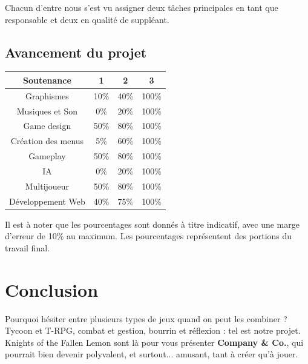 \documentclass{article}
\begin{document}
Chacun d'entre nous s'est vu assigner deux tâches principales en tant que responsable et deux en qualité de suppléant. 

\subsection{Avancement du projet}
\begin{center}
   \begin{tabular}{ | c || c | c | c | }
     \hline
 	 \textbf{Soutenance} & \textbf{1} & \textbf{2} & \textbf{3}    \\ \hline
     Graphismes & 10\% & 40\% & 100\% \\ \hline
     Musiques et Son & 0\% & 20\% & 100\% \\ \hline
     Game design & 50\% & 80\% & 100\% \\ \hline
     Création des menus & 5\% & 60\%  & 100\% \\ \hline
     Gameplay & 50\% & 80\%  & 100\% \\ \hline
     IA & 0\% & 20\%  & 100\% \\ \hline
     Multijoueur & 50\% & 80\% & 100\% \\ \hline
     Développement Web & 40\% & 75\% & 100\% \\ \hline
   \end{tabular}
 \end{center}

Il est à noter que les pourcentages sont donnés à titre indicatif, avec une marge d'erreur de 10\% au maximum. Les pourcentages représentent des portions du travail final.

\section*{Conclusion}
Pourquoi hésiter entre plusieurs types de jeux quand on peut les combiner ? Tycoon et T-RPG, combat et gestion, bourrin et réflexion : tel est notre projet. Knights of the Fallen Lemon sont là pour vous présenter \textbf{Company \& Co.}, qui pourrait bien devenir polyvalent, et surtout... amusant, tant à créer qu'à jouer. 
\end{document}
